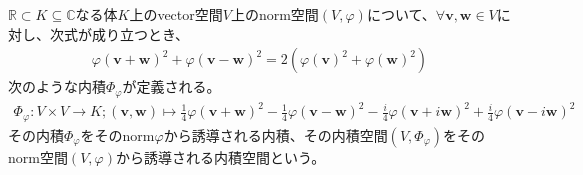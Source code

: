 \documentclass[dvipdfmx]{jsarticle}
\begin{document}
\begin{dfn}
$\mathbb{R} \subset K \subseteq \mathbb{C}$なる体$K$上のvector空間$V$上のnorm空間$(V,\varphi)$について、$\forall\mathbf{v},\mathbf{w} \in V$に対し、次式が成り立つとき、
\begin{align*}
{\varphi\left( \mathbf{v} + \mathbf{w} \right)}^{2} + {\varphi\left( \mathbf{v} - \mathbf{w} \right)}^{2} = 2\left( {\varphi\left( \mathbf{v} \right)}^{2} + {\varphi\left( \mathbf{w} \right)}^{2} \right)
\end{align*}
次のような内積$\varPhi_{\varphi}$が定義される。
\begin{align*}
\varPhi_{\varphi}:V \times V \rightarrow K;\left( \mathbf{v},\mathbf{w} \right) \mapsto \frac{1}{4}{\varphi\left( \mathbf{v} + \mathbf{w} \right)}^{2} - \frac{1}{4}{\varphi\left( \mathbf{v} - \mathbf{w} \right)}^{2} - \frac{i}{4}{\varphi\left( \mathbf{v} + i\mathbf{w} \right)}^{2} + \frac{i}{4}{\varphi\left( \mathbf{v} - i\mathbf{w} \right)}^{2}
\end{align*}
その内積$\varPhi_{\varphi}$をそのnorm$\varphi$から誘導される内積、その内積空間$\left( V,\varPhi_{\varphi} \right)$をそのnorm空間$(V,\varphi)$から誘導される内積空間という。
\end{dfn}
\end{document}
